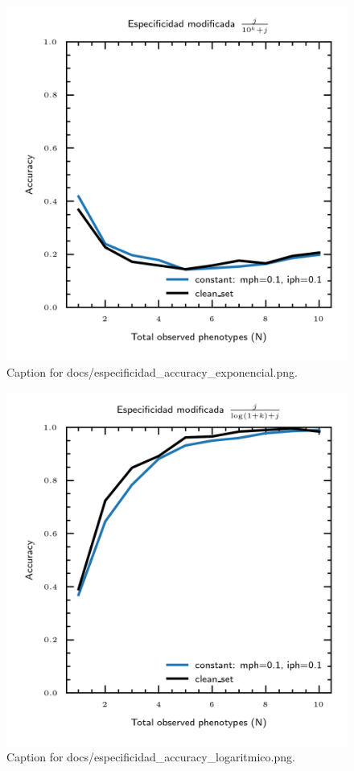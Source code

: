 \documentclass{article}
\begin{document}
\begin{figure}[h] \centering \includegraphics{docs/especificidad_accuracy_exponencial.png} \caption{Caption for docs/especificidad_accuracy_exponencial.png.} \end{figure}
\begin{figure}[h] \centering \includegraphics{docs/especificidad_accuracy_logaritmico.png} \caption{Caption for docs/especificidad_accuracy_logaritmico.png.} \end{figure}
\end{document}
